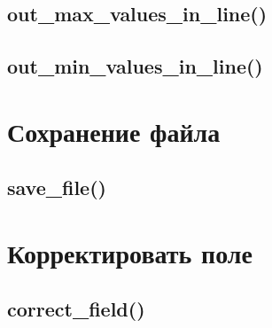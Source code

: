 \documentclass[12pt, a4paper]{article}
\begin{document}




\subsection{out\_max\_values\_in\_line()}







\subsection{out\_min\_values\_in\_line()}







\section{Сохранение файла}

\subsection{save\_file()}







\section{Корректировать поле}

\subsection{correct\_field()}
\end{document}
